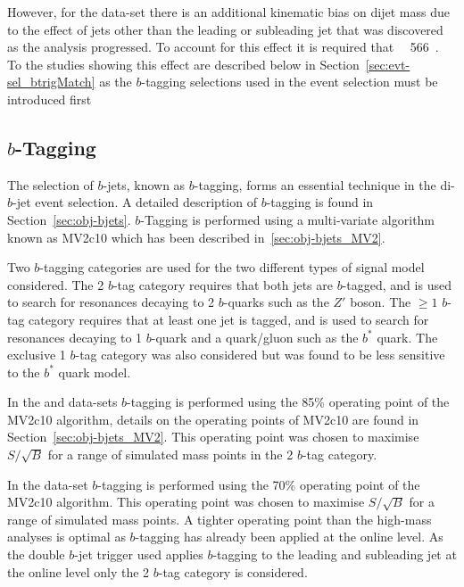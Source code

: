 However, for the \lm{} data-set
there is an additional kinematic bias on dijet mass 
due to the effect of jets other than the leading or subleading jet
that was discovered as the analysis progressed.
To account for this effect it is required that \mjj{}~\gt{}~566~\GeV{}.
To the studies showing this effect are described below in Section~\ref{sec:evt-sel_btrigMatch}
as the $b$-tagging selections used in the \lm{} event selection must be introduced first


\subsection{$b$-Tagging}
\label{sec:evt-sel-btag}

The selection of $b$-jets, known as $b$-tagging,
forms an essential technique in the di-$b$-jet event selection.
A detailed description of $b$-tagging is found in Section~\ref{sec:obj-bjets}.
$b$-Tagging is performed using a multi-variate algorithm known as MV2c10 which has been described in~\ref{sec:obj-bjets_MV2}.

Two $b$-tagging categories are used for the two different types of signal model considered.
The 2 $b$-tag category requires that both jets are $b$-tagged,
and is used to search for resonances decaying to 2 $b$-quarks such as the $Z'$ boson.
The $\geq 1$ $b$-tag category requires that at least one jet is tagged,
and is used to search for resonances decaying to 1 $b$-quark and a quark/gluon such as the $b^*$ quark.
The exclusive 1 $b$-tag category was also considered but was found to be less sensitive to the $b^*$ quark model.

In the \summer{} and \hm{} data-sets
$b$-tagging is performed using the 85\% operating point of the MV2c10 algorithm,
details on the operating points of MV2c10 are found in Section~\ref{sec:obj-bjets_MV2}.
This operating point was chosen to maximise $S/\sqrt{B}$ for a range of simulated mass points in the 2 $b$-tag category.

In the \lm{} data-set $b$-tagging is performed using the 70\% operating point of the MV2c10 algorithm.
This operating point was chosen to maximise $S/\sqrt{B}$ for a range of simulated mass points.
A tighter operating point than the high-mass analyses is optimal as $b$-tagging has already been applied at the online level.
As the double $b$-jet trigger used applies $b$-tagging to the leading and subleading jet at the online level
only the 2 $b$-tag category is considered.

